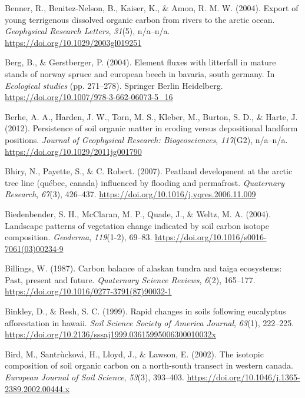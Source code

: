 \documentclass[]{article}
\begin{document}
\leavevmode\hypertarget{ref-Benner_2004}{}%
Benner, R., Benitez-Nelson, B., Kaiser, K., \& Amon, R. M. W. (2004).
Export of young terrigenous dissolved organic carbon from rivers to the
arctic ocean. \emph{Geophysical Research Letters}, \emph{31}(5),
n/a--n/a. \url{https://doi.org/10.1029/2003gl019251}

\leavevmode\hypertarget{ref-Berg_2004}{}%
Berg, B., \& Gerstberger, P. (2004). Element fluxes with litterfall in
mature stands of norway spruce and european beech in bavaria, south
germany. In \emph{Ecological studies} (pp. 271--278). Springer Berlin
Heidelberg. \url{https://doi.org/10.1007/978-3-662-06073-5_16}

\leavevmode\hypertarget{ref-Berhe_2012}{}%
Berhe, A. A., Harden, J. W., Torn, M. S., Kleber, M., Burton, S. D., \&
Harte, J. (2012). Persistence of soil organic matter in eroding versus
depositional landform positions. \emph{Journal of Geophysical Research:
Biogeosciences}, \emph{117}(G2), n/a--n/a.
\url{https://doi.org/10.1029/2011jg001790}

\leavevmode\hypertarget{ref-Bhiry_2007}{}%
Bhiry, N., Payette, S., \& C. Robert. (2007). Peatland development at
the arctic tree line (québec, canada) influenced by flooding and
permafrost. \emph{Quaternary Research}, \emph{67}(3), 426--437.
\url{https://doi.org/10.1016/j.yqres.2006.11.009}

\leavevmode\hypertarget{ref-Biedenbender_2004}{}%
Biedenbender, S. H., McClaran, M. P., Quade, J., \& Weltz, M. A. (2004).
Landscape patterns of vegetation change indicated by soil carbon isotope
composition. \emph{Geoderma}, \emph{119}(1-2), 69--83.
\url{https://doi.org/10.1016/s0016-7061(03)00234-9}

\leavevmode\hypertarget{ref-Billings_1987}{}%
Billings, W. (1987). Carbon balance of alaskan tundra and taiga
ecosystems: Past, present and future. \emph{Quaternary Science Reviews},
\emph{6}(2), 165--177.
\url{https://doi.org/10.1016/0277-3791(87)90032-1}

\leavevmode\hypertarget{ref-Binkley_1999}{}%
Binkley, D., \& Resh, S. C. (1999). Rapid changes in soils following
eucalyptus afforestation in hawaii. \emph{Soil Science Society of
America Journal}, \emph{63}(1), 222--225.
\url{https://doi.org/10.2136/sssaj1999.03615995006300010032x}

\leavevmode\hypertarget{ref-Bird_2002}{}%
Bird, M., Santrùcková, H., Lloyd, J., \& Lawson, E. (2002). The isotopic
composition of soil organic carbon on a north-south transect in western
canada. \emph{European Journal of Soil Science}, \emph{53}(3), 393--403.
\url{https://doi.org/10.1046/j.1365-2389.2002.00444.x}
\end{document}
